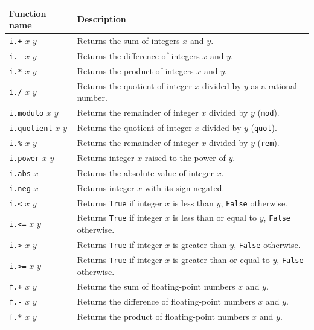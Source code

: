 \begin{table}[h]
  \begin{center}
    \begin{tabular}{ | l | p{9cm} |}
    \hline
    Function name & Description \\ \hline
    \texttt{i.+} $x$ $y$ & Returns the sum of integers $x$ and $y$. \\ \hline
    \texttt{i.-} $x$ $y$ & Returns the difference of integers $x$ and $y$. \\ \hline
    \texttt{i.*} $x$ $y$ & Returns the product of integers $x$ and $y$. \\ \hline
    \texttt{i./} $x$ $y$ & Returns the quotient of integer $x$ divided by $y$ as a rational number. \\ \hline
    \texttt{i.modulo} $x$ $y$ & Returns the remainder of integer $x$ divided by $y$ (\texttt{mod}). \\ \hline
    \texttt{i.quotient} $x$ $y$ & Returns the quotient of integer $x$ divided by $y$ (\texttt{quot}). \\ \hline
    \texttt{i.\%} $x$ $y$ & Returns the remainder of integer $x$ divided by $y$ (\texttt{rem}). \\ \hline
    \texttt{i.power} $x$ $y$ & Returns integer $x$ raised to the power of $y$. \\ \hline
    \texttt{i.abs} $x$ & Returns the absolute value of integer $x$. \\ \hline
    \texttt{i.neg} $x$ & Returns integer $x$ with its sign negated. \\ \hline
    \texttt{i.<} $x$ $y$ & Returns \texttt{True} if integer $x$ is less than $y$, \texttt{False} otherwise. \\ \hline
    \texttt{i.<=} $x$ $y$ & Returns \texttt{True} if integer $x$ is less than or equal to $y$, \texttt{False} otherwise. \\ \hline
    \texttt{i.>} $x$ $y$ & Returns \texttt{True} if integer $x$ is greater than $y$, \texttt{False} otherwise. \\ \hline
    \texttt{i.>=} $x$ $y$ & Returns \texttt{True} if integer $x$ is greater than or equal to $y$, \texttt{False} otherwise. \\ \hline
    \texttt{f.+} $x$ $y$ & Returns the sum of floating-point numbers $x$ and $y$. \\ \hline
    \texttt{f.-} $x$ $y$ & Returns the difference of floating-point numbers $x$ and $y$. \\ \hline
    \texttt{f.*} $x$ $y$ & Returns the product of floating-point numbers $x$ and $y$. \\ \hline

\end{tabular}
\end{center}
\end{table}

